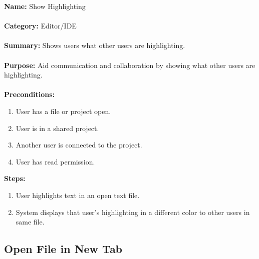 \documentclass[14pt, a4paper]{article}
\begin{document}
\begin{framed}
	\noindent\textbf{Name:} Show Highlighting \\ \\
	\textbf{Category:} Editor/IDE \\ \\
	\textbf{Summary:} Shows users what other users are highlighting. \\ \\
	\textbf{Purpose:} Aid communication and collaboration by showing what other users are highlighting. \\ \\
	\textbf{Preconditions:} 
	\begin{enumerate}
		\item User has a file or project open.
		\item User is in a shared project.
		\item Another user is connected to the project.
		\item User has read permission.
	\end{enumerate}		
	\textbf{Steps:}
	\begin{enumerate}
		\item User highlights text in an open text file.
		\item System displays that user’s highlighting in a different color to other users in same file.
	\end{enumerate}	
\end{framed}
\newpage

\subsection{Open File in New Tab}
\end{document}
